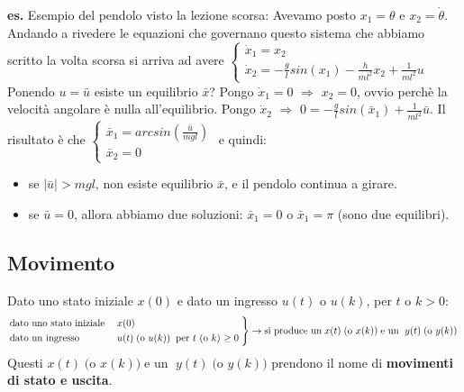 \newline
\textbf{es.} Esempio del pendolo visto la lezione scorsa:\newline
Avevamo posto $x_1 = \theta$ e $x_2 = \dot{\theta}$. Andando a rivedere le equazioni che governano questo sistema che abbiamo scritto la volta scorsa si arriva ad avere $\begin{cases}
    \dot{x}_1 = x_2\\
    \dot{x}_2 = - \frac{g}{l} sin(x_1) - \frac{h}{ml^2} x_2 + \frac{1}{ml^2}u
\end{cases}$
Ponendo $u = \bar{u}$ esiste un equilibrio $\bar{x}$?\newline
Pongo $\dot{x}_1= 0$ $\Longrightarrow$ $x_2 = 0$, ovvio perchè la velocità angolare è nulla all'equilibrio.\newline
Pongo $\dot{x}_2$ $\Longrightarrow$ $0 = - \frac{g}{l}sin(\bar{x}_1) + \frac{1}{ml^2} \bar{u}$.\newline
Il risultato è che $\begin{cases}
    \bar{x}_1 = arcsin(\frac{\bar{u}}{mgl})\\
    \bar{x}_2 = 0
\end{cases}$ e quindi:
\begin{itemize}
    \item  se $|\bar{u}| > mgl$, non esiste equilibrio $\bar{x}$, e il pendolo continua a girare.
    \item  se $\bar{u} = 0$, allora abbiamo due soluzioni: $\bar{x}_1 = 0$ o $\bar{x}_1 = \pi$ (sono due equilibri).
\end{itemize}
\subsection{Movimento}
Dato uno stato iniziale $x(0)$ e dato un ingresso $u(t)$ o $u(k)$, per $t$ o $k > 0$:
\[
    \begin{rcases}
        \text{dato uno stato iniziale}\; &x(0)\\
        \text{dato un ingresso}\; &u(t) \;\text{(o $u(k)$)} \;\;\text{per $t$ (o $k$) $\geq 0$}\;
    \end{rcases} \rightarrow \text{si produce un}\; x(t) \;\text{(o $x(k)$)}\; \text{e un }\;y(t) \;\text{(o $y(k)$)}\; 
\]
Questi $x(t) \;\text{(o $x(k)$)} \;\text{e un }\;y(t) \;\text{(o $y(k)$)}$ prendono il nome di \textbf{movimenti di stato e uscita}.
